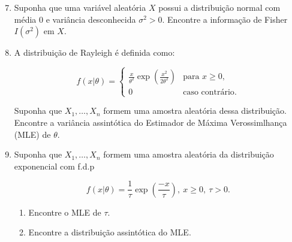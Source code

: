 \documentclass[leqno, 12pt]{article}
\theoremstyle{definition}
\begin{document}
\begin{enumerate}
\setcounter{enumi}{6}


\item \textbf{\parencite[ex. 5, pág. 527]{DeGroot:2014}} Suponha que uma variável aleatória $X$ possui a distribuição normal com média $0$ e variância desconhecida $\sigma^2 > 0$. Encontre a informação de Fisher $I(\sigma^2)$ em $X$.


\item \textbf{\parencite[ex. 4, pág 13]{Zheng:2020}} A distribuição de Rayleigh é definida como:

\[ f(x|\theta) = \begin{cases}
\frac{x}{\theta^2} \exp(\frac{x^2}{2\theta^2}) & \text{para } x \ge 0, \\
0 & \text{caso contrário}.
\end{cases} \]

Suponha que $X_1, \ldots, X_n$ formem uma amostra aleatória dessa distribuição. Encontre a variância assintótica do Estimador de Máxima Verossimlhança (MLE) de $\theta$.


\item \textbf{\parencite[ex. 6, pág 13]{Zheng:2020}} Suponha que $X_1, \ldots, X_n$ formem uma amostra aleatória da distribuição exponencial com f.d.p 

\[ f(x | \theta) = \frac{1}{\tau} \exp(\frac{-x}{\tau}), \ x \ge 0, \ \tau > 0. \]

\begin{enumerate}
    \item Encontre o MLE de $\tau$.

    \item Encontre a distribuição assintótica do MLE.
\end{enumerate}

\end{enumerate}

\section*{}

\nocite{*}
% 
% 
\printbibliography
\end{document}
